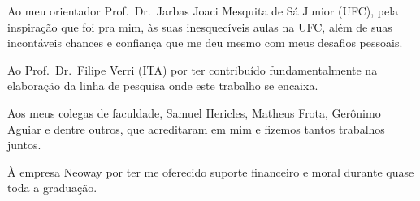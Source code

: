 Ao meu orientador Prof.\ Dr.\ Jarbas Joaci Mesquita de Sá Junior (UFC), pela
inspiração que foi pra mim, às suas inesquecíveis aulas na UFC, além
de suas incontáveis chances e confiança que me deu mesmo com meus
desafios pessoais.

Ao Prof.\ Dr.\ Filipe Verri (ITA) por ter contribuído fundamentalmente
na elaboração da linha de pesquisa onde este trabalho se encaixa.

Aos meus colegas de faculdade, Samuel Hericles, Matheus Frota,
Gerônimo Aguiar e dentre outros, que acreditaram em mim e fizemos
tantos trabalhos juntos.

À empresa Neoway por ter me oferecido suporte financeiro e moral
durante quase toda a graduação.
